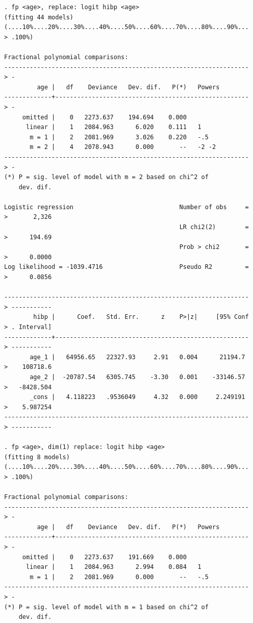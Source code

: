 \documentclass{article}
\begin{document}
\begin{enumerate}[a.]
\begin{verbatim}
. fp <age>, replace: logit hibp <age>
(fitting 44 models)
(....10%....20%....30%....40%....50%....60%....70%....80%....90%...
> .100%)

Fractional polynomial comparisons:
-------------------------------------------------------------------
> -
         age |   df    Deviance   Dev. dif.   P(*)   Powers
-------------+-----------------------------------------------------
> -
     omitted |    0   2273.637    194.694    0.000               
      linear |    1   2084.963      6.020    0.111   1           
       m = 1 |    2   2081.969      3.026    0.220   -.5         
       m = 2 |    4   2078.943      0.000       --   -2 -2       
-------------------------------------------------------------------
> -
(*) P = sig. level of model with m = 2 based on chi^2 of
    dev. dif.

Logistic regression                             Number of obs     =
>       2,326
                                                LR chi2(2)        =
>      194.69
                                                Prob > chi2       =
>      0.0000
Log likelihood = -1039.4716                     Pseudo R2         =
>      0.0856

-------------------------------------------------------------------
> -----------
        hibp |      Coef.   Std. Err.      z    P>|z|     [95% Conf
> . Interval]
-------------+-----------------------------------------------------
> -----------
       age_1 |   64956.65   22327.93     2.91   0.004      21194.7 
>    108718.6
       age_2 |  -20787.54   6305.745    -3.30   0.001    -33146.57 
>   -8428.504
       _cons |   4.118223   .9536049     4.32   0.000     2.249191 
>    5.987254
-------------------------------------------------------------------
> -----------

. fp <age>, dim(1) replace: logit hibp <age>
(fitting 8 models)
(....10%....20%....30%....40%....50%....60%....70%....80%....90%...
> .100%)

Fractional polynomial comparisons:
-------------------------------------------------------------------
> -
         age |   df    Deviance   Dev. dif.   P(*)   Powers
-------------+-----------------------------------------------------
> -
     omitted |    0   2273.637    191.669    0.000               
      linear |    1   2084.963      2.994    0.084   1           
       m = 1 |    2   2081.969      0.000       --   -.5         
-------------------------------------------------------------------
> -
(*) P = sig. level of model with m = 1 based on chi^2 of
    dev. dif.


\end{verbatim}
\end{enumerate}
\end{document}
